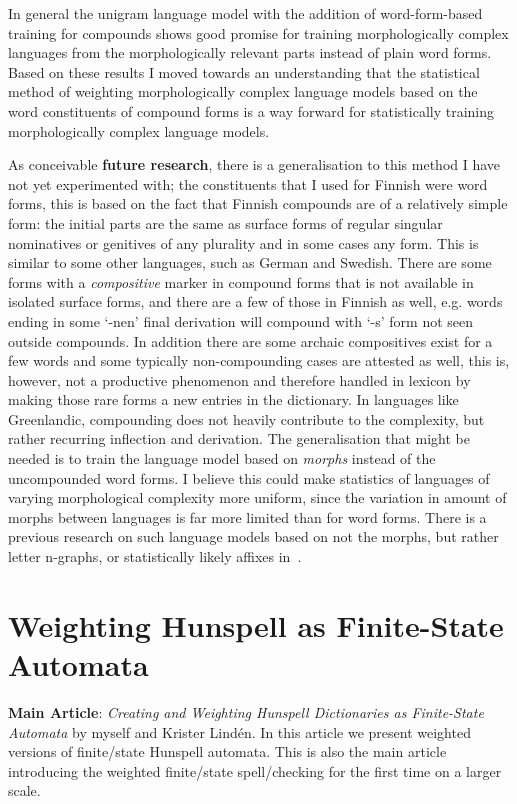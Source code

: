 \documentclass[officiallayout]{unihelcompling}
\begin{document}
In general the unigram language model with the addition of word-form-based
training for compounds shows good promise for training
morphologically complex languages from the morphologically relevant parts
instead of plain word forms. Based on these results I moved towards an 
understanding that the statistical method of weighting morphologically complex
language models based on the word constituents of compound forms is a way 
forward for statistically training morphologically complex language models.

As conceivable \textbf{future research}, there is a generalisation to this
method I have not yet experimented with; the constituents that I used for
Finnish were word forms, this is based on the fact that Finnish compounds are
of a relatively simple form: the initial parts are the same as surface forms of
regular singular nominatives or genitives of any plurality and in some cases
any form. This is similar to some other languages, such as German and Swedish.
There are some forms with a \emph{compositive} marker in compound forms that is
not available in isolated surface forms, and there are a few of those in
Finnish as well, e.g.\/ words ending in some `-nen' final derivation will
compound with `-s' form not seen outside compounds. In addition there
are some archaic compositives exist for a few words and some typically 
non-compounding cases are attested as well, this is, however, not a productive
phenomenon and therefore handled in lexicon by making those rare forms a new
entries in the dictionary.  In languages like Greenlandic, compounding
does not heavily contribute to the complexity, but rather recurring inflection
and derivation. The generalisation that might be needed is to train the
language model based on \emph{morphs} instead of the uncompounded word forms.
I believe this could make statistics of languages of varying morphological
complexity more uniform, since the variation in amount of morphs between
languages is far more limited than for word forms. There is a previous research
on such language models based on not the morphs, but rather letter n-graphs, or
statistically likely affixes in~\citet{creutz2005morfessor}.


\section{Weighting Hunspell as Finite-State Automata}
\label{sec:hunspell-training}

\textbf{Main Article}: \emph{Creating and Weighting Hunspell Dictionaries as
Finite-State Automata} by myself and Krister Lindén. In this article we present
weighted versions of finite\-/state Hunspell automata. This is also the main
article introducing the weighted finite\-/state spell\-/checking for the first time
on a larger scale.
\end{document}
